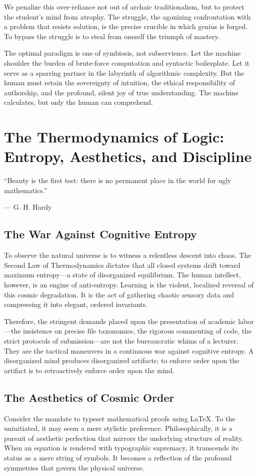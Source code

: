 \documentclass[11pt,a4paper,oneside]{book}
\theoremstyle{definition}
\theoremstyle{remark}
\begin{document}
We penalize this over-reliance not out of archaic traditionalism, but to protect the student's mind from atrophy. The struggle, the agonizing confrontation with a problem that resists solution, is the precise crucible in which genius is forged. To bypass the struggle is to steal from oneself the triumph of mastery. 

The optimal paradigm is one of symbiosis, not subservience. Let the machine shoulder the burden of brute-force computation and syntactic boilerplate. Let it serve as a sparring partner in the labyrinth of algorithmic complexity. But the human must retain the sovereignty of intuition, the ethical responsibility of authorship, and the profound, silent joy of true understanding. The machine calculates, but only the human can comprehend.

\chapter{The Thermodynamics of Logic: Entropy, Aesthetics, and Discipline}
\epigraph{``Beauty is the first test: there is no permanent place in the world for ugly mathematics.''}{--- G. H. Hardy}

\section{The War Against Cognitive Entropy}
To observe the natural universe is to witness a relentless descent into chaos. The Second Law of Thermodynamics dictates that all closed systems drift toward maximum entropy---a state of disorganized equilibrium. The human intellect, however, is an engine of anti-entropy. Learning is the violent, localized reversal of this cosmic degradation. It is the act of gathering chaotic sensory data and compressing it into elegant, ordered invariants.

Therefore, the stringent demands placed upon the presentation of academic labor---the insistence on precise file taxonomies, the rigorous commenting of code, the strict protocols of submission---are not the bureaucratic whims of a lecturer. They are the tactical maneuvers in a continuous war against cognitive entropy. A disorganized mind produces disorganized artifacts; to enforce order upon the artifact is to retroactively enforce order upon the mind.

\section{The Aesthetics of Cosmic Order}
Consider the mandate to typeset mathematical proofs using \LaTeX. To the uninitiated, it may seem a mere stylistic preference. Philosophically, it is a pursuit of aesthetic perfection that mirrors the underlying structure of reality. When an equation is rendered with typographic supremacy, it transcends its status as a mere string of symbols. It becomes a reflection of the profound symmetries that govern the physical universe.
\end{document}
